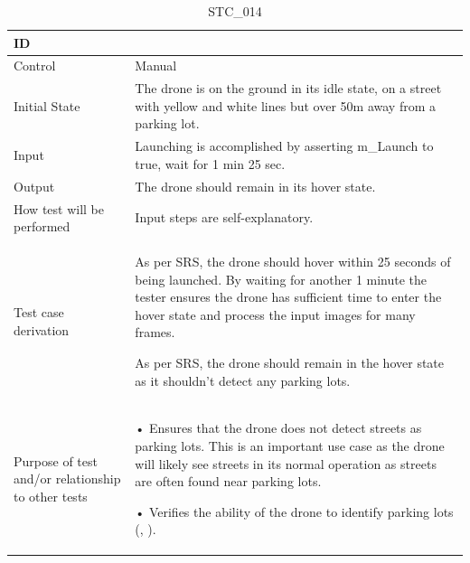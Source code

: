 \documentclass[12pt, titlepage]{article}
\begin{document}
\begin{table}[!h]
\begin{center}
\caption {STC\_014}
\label{tab:STC_014}
\begin{tabular}{ | m{3.2cm} | m{12.2cm} | } 
\hline
ID & \nameref{tab:STC_014} \\ 
\hline
Control & Manual \\ 
\hline
Initial State & The drone is on the ground in its idle state, on a street with yellow and white lines but over 50m away from a parking lot. \\ 
\hline
Input & Launching is accomplished by asserting m_Launch to true, wait for 1 min 25 sec. \\ 
\hline
Output & The drone should remain in its hover state. \\ 
\hline
How test will be performed & Input steps are self-explanatory. \\ 
\hline
Test case derivation & As per SRS, the drone should hover within 25 seconds of being launched. By waiting for another 1 minute the tester ensures the drone has sufficient time to enter the hover state and process the input images for many frames. 

As per SRS, the drone should remain in the hover state as it shouldn't detect any parking lots.
 \\ 
\hline
Purpose of test and/or relationship to other tests & 
• Ensures that the drone does not detect streets as parking lots. This is an important use case as the drone will likely see streets in its normal operation as streets are often found near parking lots.

• Verifies the ability of the drone to identify parking lots (\nameref{GEN_001}, \nameref{SR_009}).
\\ 
\hline
\end{tabular}
\end{center}
\end{table}
\end{document}
